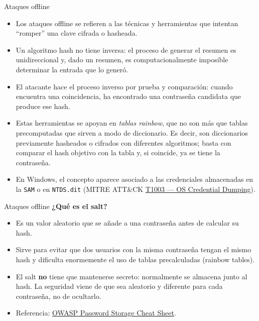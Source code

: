 \documentclass[aspectratio=169,11pt]{beamer}
\newcommand{\cmd}[1]{\texttt{#1}}
\newcommand{\lead}[1]{{\bfseries #1}\par\medskip}
\begin{document}
\begin{frame}[allowframebreaks]{Ataques offline}
\small
  \begin{itemize}
  \item Los ataques offline se refieren a las técnicas y herramientas que intentan ``romper'' una clave cifrada o hasheada.
  \item Un algoritmo hash no tiene inversa: el proceso de generar el resumen es unidireccional y, dado un resumen, es computacionalmente imposible determinar la entrada que lo generó.
  \item El atacante hace el proceso inverso por prueba y comparación: cuando encuentra una coincidencia, ha encontrado una contraseña candidata que produce ese hash.
  \item Estas herramientas se apoyan en \emph{tablas rainbow}, que no son más que tablas precomputadas que sirven a modo de diccionario. Es decir, son diccionarios previamente hasheados o cifrados con diferentes algoritmos; basta con comparar el hash objetivo con la tabla y, si coincide, ya se tiene la contraseña.
  \item En Windows, el concepto aparece asociado a las credenciales almacenadas en la \cmd{SAM} o en \cmd{NTDS.dit} (MITRE ATT\&CK \href{https://attack.mitre.org/techniques/T1003/}{T1003 --- OS Credential Dumping}).
  \end{itemize}
\end{frame}

\begin{frame}{Ataques offline}
\small
\lead{¿Qué es el salt?}
  \begin{itemize}
  \item Es un valor aleatorio que se añade a una contraseña antes de calcular su hash.
  \item Sirve para evitar que dos usuarios con la misma contraseña tengan el mismo hash y dificulta enormemente el uso de tablas precalculadas (rainbow tables).
  \item El salt \textbf{no} tiene que mantenerse secreto: normalmente se almacena junto al hash. La seguridad viene de que sea aleatorio y diferente para cada contraseña, no de ocultarlo.
  \item Referencia: \href{https://cheatsheetseries.owasp.org/cheatsheets/Password_Storage_Cheat_Sheet.html}{OWASP Password Storage Cheat Sheet}.
  \end{itemize}
\end{frame}
\end{document}
